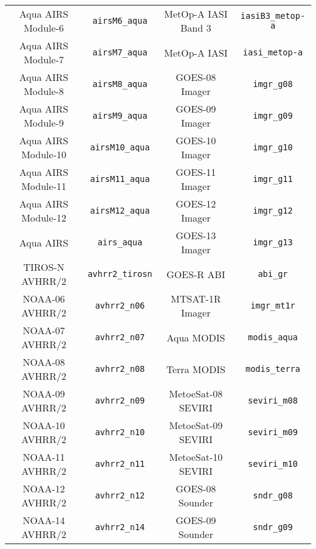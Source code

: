 \begin{table}[htp]
\begin{tabular}{|c|c||c|c|}
Aqua AIRS Module-6  & \texttt{airsM6\_aqua}        & MetOp-A IASI Band 3 & \texttt{iasiB3\_metop-a}            \\
Aqua AIRS Module-7  & \texttt{airsM7\_aqua}        & MetOp-A IASI & \texttt{iasi\_metop-a}                     \\
Aqua AIRS Module-8  & \texttt{airsM8\_aqua}        & GOES-08 Imager & \texttt{imgr\_g08}                       \\
Aqua AIRS Module-9  & \texttt{airsM9\_aqua}        & GOES-09 Imager & \texttt{imgr\_g09}                       \\
Aqua AIRS Module-10 & \texttt{airsM10\_aqua}       & GOES-10 Imager & \texttt{imgr\_g10}                       \\
Aqua AIRS Module-11 & \texttt{airsM11\_aqua}       & GOES-11 Imager & \texttt{imgr\_g11}                       \\
Aqua AIRS Module-12 & \texttt{airsM12\_aqua}       & GOES-12 Imager & \texttt{imgr\_g12}                       \\
Aqua AIRS & \texttt{airs\_aqua}                    & GOES-13 Imager & \texttt{imgr\_g13}                       \\
TIROS-N AVHRR/2 & \texttt{avhrr2\_tirosn}          & GOES-R ABI & \texttt{abi\_gr}                             \\
NOAA-06 AVHRR/2 & \texttt{avhrr2\_n06}             & MTSAT-1R Imager & \texttt{imgr\_mt1r}                     \\
NOAA-07 AVHRR/2 & \texttt{avhrr2\_n07}             & Aqua MODIS & \texttt{modis\_aqua}                         \\
NOAA-08 AVHRR/2 & \texttt{avhrr2\_n08}             & Terra MODIS & \texttt{modis\_terra}                       \\
NOAA-09 AVHRR/2 & \texttt{avhrr2\_n09}             & MetoeSat-08 SEVIRI & \texttt{seviri\_m08}                 \\
NOAA-10 AVHRR/2 & \texttt{avhrr2\_n10}             & MetoeSat-09 SEVIRI & \texttt{seviri\_m09}                 \\
NOAA-11 AVHRR/2 & \texttt{avhrr2\_n11}             & MetoeSat-10 SEVIRI & \texttt{seviri\_m10}                 \\
NOAA-12 AVHRR/2 & \texttt{avhrr2\_n12}             & GOES-08 Sounder & \texttt{sndr\_g08}                      \\
NOAA-14 AVHRR/2 & \texttt{avhrr2\_n14}             & GOES-09 Sounder & \texttt{sndr\_g09}                      \\

\end{tabular}
\end{table}
